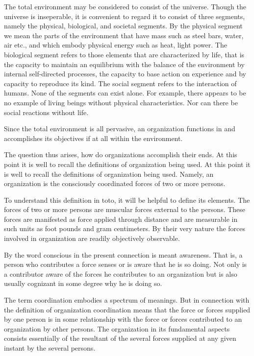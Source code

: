 The total environment may be considered to consist of the universe. Though the universe is inseperable, it is convenient to regard it to consist of three segments, namely the physical, biological, and societal segments. By the physical segment we mean the parts of the environment that have mass such as steel bars, water, air etc., and which embody physical energy such as heat, light power. The biological segment refers to those elements that are characterized by life, that is the capacity to maintain an equilibrium with the balance of the environment by internal self-directed processes, the capacity to base action on experience and by capacity to reproduce its kind. The social segment refers to the interaction of humans. None of the segments can exist alone. For example, there appears to be no example of living beings without physical characteristics. Nor can there be social reactions without life.

Since the total environment is all pervasive, an organization functions in and accomplishes its objectives if at all within the environment.

The question thus arises, how do organizations accomplish their ends. At this point it is well to recall the definitions of organization being used. At this point it is well to recall the definitions of organization being used. Namely, an organization is the consciously coordinated forces of two or more persons.

To understand this definition in toto, it will be helpful to define its elements. The forces of two or more persons are muscular forces external to the persons. These forces are manifested as force applied through distance and are measurable in such units as foot pounds and gram centimeters. By their very nature the forces involved in organization are readily objectively observable.

By the word conscious in the present connection is meant awareness. That is, a person who contributes a force senses or is aware that he is so doing. Not only is a contributor aware of the forces he contributes to an organization but is also usually cognizant in some degree why he is doing so.

The term coordination embodies a spectrum of meanings. But in connection with the definition of organization coordination means that the force or forces supplied by one person is in some relationship with the force or forces contributed to an organization by other persons. The organization in its fundamental aspects consists essentially of the resultant of the several forces supplied at any given instant by the several persons.

